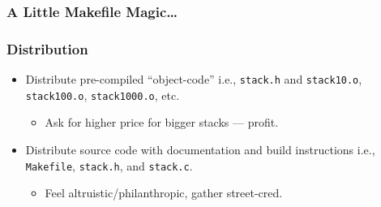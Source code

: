 \begin{frame}[fragile]

\frametitle{A Little Makefile Magic\ldots}



\end{frame}



\begin{frame}

\frametitle{Distribution}

\begin{itemize}

\item Distribute pre-compiled ``object-code'' i.e., \texttt{stack.h} and
\texttt{stack10.o}, \texttt{stack100.o}, \texttt{stack1000.o}, etc.

\begin{itemize}

\item Ask for higher price for bigger stacks --- profit.

\end{itemize}

\item Distribute source code with documentation and build instructions i.e.,
\texttt{Makefile}, \texttt{stack.h}, and \texttt{stack.c}.

\begin{itemize}

\item Feel altruistic/philanthropic, gather street-cred.

\end{itemize}

\end{itemize}

\end{frame}
